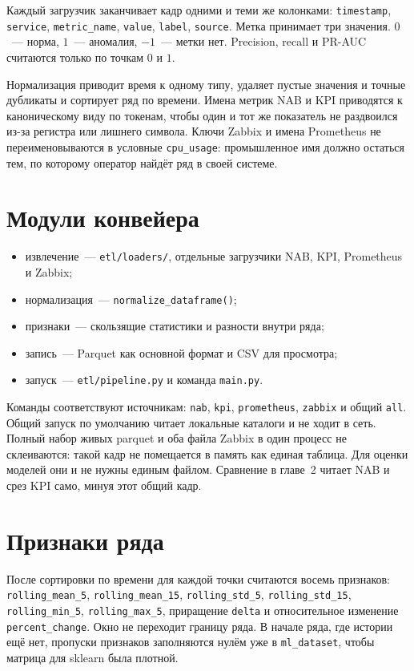 Каждый загрузчик заканчивает кадр одними и теми же колонками:
\texttt{timestamp}, \texttt{service}, \texttt{metric\_name}, \texttt{value}, \texttt{label}, \texttt{source}.
Метка принимает три значения.
\(0\)~--- норма, \(1\)~--- аномалия, \(-1\)~--- метки нет.
Precision, recall и PR-AUC считаются только по точкам \(0\) и \(1\).

Нормализация приводит время к одному типу, удаляет пустые значения и точные дубликаты и сортирует ряд по времени.
Имена метрик NAB и KPI приводятся к каноническому виду по токенам, чтобы один и тот же показатель не раздвоился из-за регистра или лишнего символа.
Ключи Zabbix и имена Prometheus не переименовываются в условные \texttt{cpu\_usage}: промышленное имя должно остаться тем, по которому оператор найдёт ряд в своей системе.

\section{Модули конвейера}

\begin{itemize}
  \item извлечение~--- \texttt{etl/loaders/}, отдельные загрузчики NAB, KPI, Prometheus и Zabbix;
  \item нормализация~--- \texttt{normalize\_dataframe()};
  \item признаки~--- скользящие статистики и разности внутри ряда;
  \item запись~--- Parquet как основной формат и CSV для просмотра;
  \item запуск~--- \texttt{etl/pipeline.py} и команда \texttt{main.py}.
\end{itemize}

Команды соответствуют источникам: \texttt{nab}, \texttt{kpi}, \texttt{prometheus}, \texttt{zabbix} и общий \texttt{all}.
Общий запуск по умолчанию читает локальные каталоги и не ходит в сеть.
Полный набор живых parquet и оба файла Zabbix в один процесс не склеиваются: такой кадр не помещается в память как единая таблица.
Для оценки моделей они и не нужны единым файлом.
Сравнение в главе~2 читает NAB и срез KPI само, минуя этот общий кадр.

\section{Признаки ряда}

После сортировки по времени для каждой точки считаются восемь признаков:
\texttt{rolling\_mean\_5}, \texttt{rolling\_mean\_15},
\texttt{rolling\_std\_5}, \texttt{rolling\_std\_15},
\texttt{rolling\_min\_5}, \texttt{rolling\_max\_5},
приращение \texttt{delta} и относительное изменение \texttt{percent\_change}.
Окно не переходит границу ряда.
В начале ряда, где истории ещё нет, пропуски признаков заполняются нулём уже в \texttt{ml\_dataset}, чтобы матрица для sklearn была плотной.

